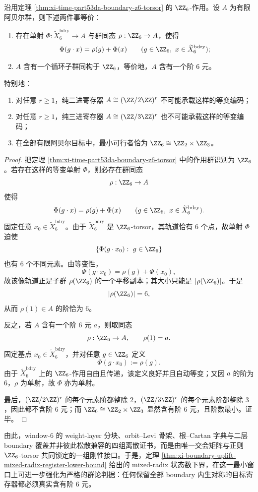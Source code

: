 \begin{corollary}\label{cor:xi-time-part53da-equivariant-boundary-coding-order-six}
沿用定理 \ref{thm:xi-time-part53da-boundary-z6-torsor} 的 \(\ZZ_6\)-作用。设 \(A\) 为有限阿贝尔群，则下述两件事等价：
\begin{enumerate}
  \item 存在单射 \(\Phi:\widetilde X_6^{\mathrm{bdry}}\to A\) 与群同态 \(\rho:\ZZ_6\to A\)，使得
  \[
  \Phi(g\cdot x)=\rho(g)+\Phi(x)
  \qquad
  (g\in \ZZ_6,\ x\in \widetilde X_6^{\mathrm{bdry}});
  \]
  \item \(A\) 含有一个循环子群同构于 \(\ZZ_6\)，等价地，\(A\) 含有一个阶 \(6\) 元。
\end{enumerate}
特别地：
\begin{enumerate}
  \item 对任意 \(r\ge 1\)，纯二进寄存器 \(A\cong (\ZZ/2\ZZ)^r\) 不可能承载这样的等变编码；
  \item 对任意 \(r\ge 1\)，纯三进寄存器 \(A\cong (\ZZ/3\ZZ)^r\) 也不可能承载这样的等变编码；
  \item 在全部有限阿贝尔目标中，最小可行者恰为 \(\ZZ_6\cong \ZZ_2\times \ZZ_3\)。
\end{enumerate}
\end{corollary}
\begin{proof}
把定理 \ref{thm:xi-time-part53da-boundary-z6-torsor} 中的作用群识别为 \(\ZZ_6\)。若存在这样的等变单射 \(\Phi\)，则必存在群同态
\[
\rho:\ZZ_6\to A
\]
使得
\[
\Phi(g\cdot x)=\rho(g)+\Phi(x)
\qquad
(g\in \ZZ_6,\ x\in \widetilde X_6^{\mathrm{bdry}}).
\]
固定任意 \(x_0\in \widetilde X_6^{\mathrm{bdry}}\)。由于 \(\widetilde X_6^{\mathrm{bdry}}\) 是 \(\ZZ_6\)-torsor，其轨道恰有 \(6\) 个点，故单射 \(\Phi\) 迫使
\[
\{\Phi(g\cdot x_0):\ g\in \ZZ_6\}
\]
也有 \(6\) 个不同元素。由等变性，
\[
\Phi(g\cdot x_0)=\rho(g)+\Phi(x_0),
\]
故该像轨道正是子群 \(\rho(\ZZ_6)\) 的一个平移副本；其大小只能是 \(|\rho(\ZZ_6)|\)。于是
\[
|\rho(\ZZ_6)|=6,
\]
从而 \(\rho(1)\in A\) 的阶恰为 \(6\)。

反之，若 \(A\) 含有一个阶 \(6\) 元 \(a\)，则取同态
\[
\rho:\ZZ_6\to A,\qquad \rho(1)=a.
\]
固定基点 \(x_0\in \widetilde X_6^{\mathrm{bdry}}\)，并对任意 \(g\in \ZZ_6\) 定义
\[
\Phi(g\cdot x_0):=\rho(g).
\]
由于 \(\widetilde X_6^{\mathrm{bdry}}\) 上的 \(\ZZ_6\)-作用自由且传递，该定义良好并且自动等变；又因 \(a\) 的阶为 \(6\)，\(\rho\) 为单射，故 \(\Phi\) 亦为单射。

最后，\((\ZZ/2\ZZ)^r\) 的每个元素阶都整除 \(2\)，\((\ZZ/3\ZZ)^r\) 的每个元素阶都整除 \(3\)，因此都不含阶 \(6\) 元；而 \(\ZZ_6\cong\ZZ_2\times\ZZ_3\) 显然含有阶 \(6\) 元，且阶数最小。证毕。
\end{proof}

\noindent
由此，window-\(6\) 的 weight-layer 分块、orbit--Levi 骨架、根--Cartan 字典与二层 boundary 覆盖并非彼此松散兼容的四组离散证书，而是由唯一交会矩阵与正则 \(\ZZ_6\)-torsor 共同锁定的一组刚性接口。于是，定理 \ref{thm:xi-boundary-uplift-mixed-radix-register-lower-bound} 给出的 mixed-radix 状态数下界，在这一最小窗口上可进一步强化为严格的群论判据：任何保留全部 boundary 内生对称的目标寄存器都必须真实含有阶 \(6\) 元。

\endinput
